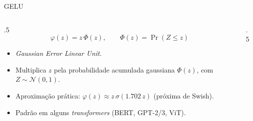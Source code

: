 \documentclass[aspectratio=169,xcolor=dvipsnames]{beamer}
\begin{document}
  \begin{frame}{GELU}
    \begin{columns}
      \begin{column}{.5\linewidth}
        \[
          \varphi(z) = z\,\Phi(z),\qquad \Phi(z)=\Pr(Z\le z)
        \]
        \begin{itemize}
          \item \textit{Gaussian Error Linear Unit}.
          \item Multiplica $z$ pela probabilidade acumulada gaussiana $\Phi(z)$,
            com $Z\sim\mathcal{N}(0,1)$.
          \item Aproximação prática: $\varphi(z)\approx z\,\sigma(1.702\,z)$ (próxima de Swish).
          \item Padrão em alguns \textit{transformers} (BERT, GPT-2/3, ViT).
        \end{itemize}
      \end{column}
      \begin{column}{.5\linewidth}
        \centering
      \end{column}
    \end{columns}
  \end{frame}
\end{document}
